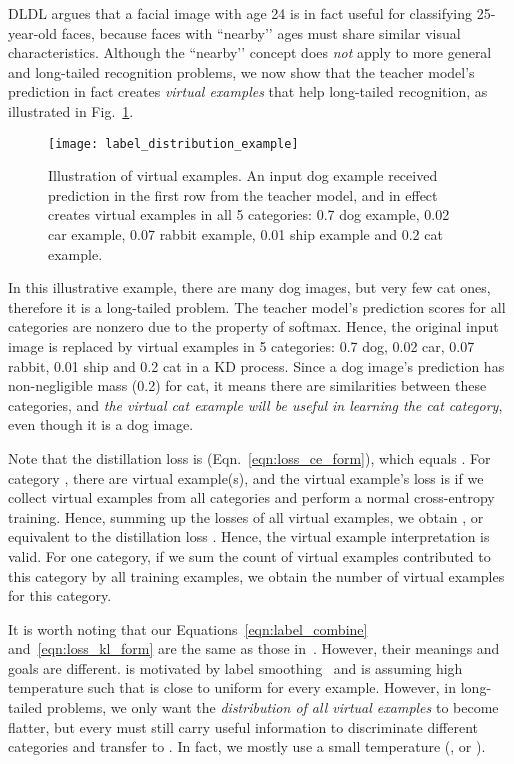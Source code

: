 \documentclass[10pt,twocolumn,letterpaper]{article}
\begin{document}
DLDL argues that a facial image with age 24 is in fact useful for classifying 25-year-old faces, because faces with ``nearby’’ ages must share similar visual characteristics. Although the ``nearby’’ concept does \emph{not} apply to more general and long-tailed recognition problems, we now show that the teacher model’s prediction in fact creates \emph{virtual examples} that help long-tailed recognition, as illustrated in Fig.~\ref{label_distribution_example}.

\begin{figure}
   \centering
   \texttt{[image: label\_distribution\_example]}
   \caption{Illustration of virtual examples. An input dog example received prediction in the first row from the teacher model, and in effect creates virtual examples in all 5 categories: 0.7 dog example, 0.02 car example, 0.07 rabbit example, 0.01 ship example and 0.2 cat example.}
   \label{label_distribution_example}
\end{figure}

In this illustrative example, there are many dog images, but very few cat ones, therefore it is a long-tailed problem. The teacher model’s prediction scores for all categories are nonzero due to the property of softmax. Hence, the original input image is replaced by virtual examples in 5 categories: 0.7 dog, 0.02 car, 0.07 rabbit, 0.01 ship and 0.2 cat in a KD process. Since a dog image’s prediction has non-negligible mass (0.2) for cat, it means there are similarities between these categories, and \emph{the virtual cat example will be useful in learning the cat category}, even though it is a dog image. 

Note that the distillation loss is  (Eqn.~\ref{eqn:loss_ce_form}), which equals . For category , there are  virtual example(s), and the virtual example’s loss is  if we collect virtual examples from all categories and perform a normal cross-entropy training. Hence, summing up the losses of all virtual examples, we obtain , or equivalent to the distillation loss . Hence, the virtual example interpretation is valid. For one category, if we sum the count of virtual examples contributed to this category by all training examples, we obtain the number of virtual examples for this category.

It is worth noting that our Equations~\eqref{eqn:label_combine} and~\eqref{eqn:loss_kl_form} are the same as those in~\cite{yuan2020revisitingkd}. However, their meanings and goals are different. \cite{yuan2020revisitingkd} is motivated by label smoothing~\cite{Szegedy2016InceptionV2} and is assuming high temperature  such that  is close to uniform for every example. However, in long-tailed problems, we only want the \emph{distribution of all virtual examples} to become flatter, but every  must still carry useful information to discriminate different categories and transfer to . In fact, we mostly use a small temperature (\eg,  or ).
\end{document}
